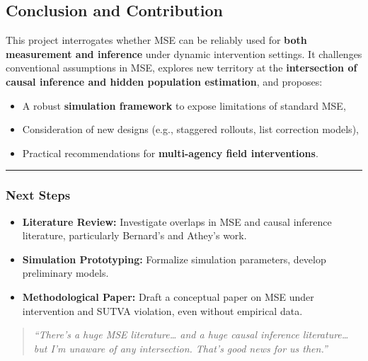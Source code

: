 \documentclass[
  12pt,
]{article}
\theoremstyle{plain}
\theoremstyle{definition}
\begin{document}
\subsection{\texorpdfstring{\textbf{Conclusion and
Contribution}}{Conclusion and Contribution}}\label{conclusion-and-contribution}

This project interrogates whether MSE can be reliably used for
\textbf{both measurement and inference} under dynamic intervention
settings. It challenges conventional assumptions in MSE, explores new
territory at the \textbf{intersection of causal inference and hidden
population estimation}, and proposes:

\begin{itemize}
\item
  A robust \textbf{simulation framework} to expose limitations of
  standard MSE,
\item
  Consideration of new designs (e.g., staggered rollouts, list
  correction models),
\item
  Practical recommendations for \textbf{multi-agency field
  interventions}.
\end{itemize}

\begin{center}\rule{0.5\linewidth}{0.5pt}\end{center}

\subsubsection{\texorpdfstring{\textbf{Next
Steps}}{Next Steps}}\label{next-steps}

\begin{itemize}
\item
  \textbf{Literature Review:} Investigate overlaps in MSE and causal
  inference literature, particularly Bernard's and Athey's work.
\item
  \textbf{Simulation Prototyping:} Formalize simulation parameters,
  develop preliminary models.
\item
  \textbf{Methodological Paper:} Draft a conceptual paper on MSE under
  intervention and SUTVA violation, even without empirical data.
\end{itemize}

\begin{quote}
\emph{``There's a huge MSE literature\ldots{} and a huge causal
inference literature\ldots{} but I'm unaware of any intersection. That's
good news for us then.''}
\end{quote}
\end{document}
